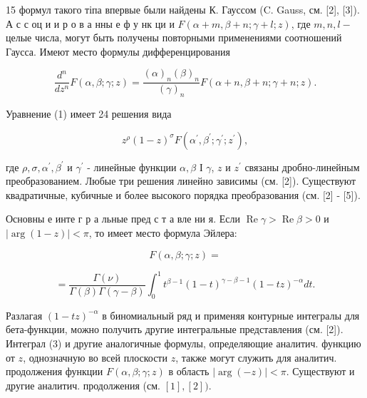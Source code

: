 \documentclass[10pt]{article}
\begin{document}
15 формул такого тіпа впервые были найдены К. Гауссом (C. Gauss, см. [2], [3]). А с с оц и и р о в а нны е ф у нк ци и $F(\alpha+m, \beta+n ; \gamma+l ; z)$, где $m, n, l-$ целые числа, могут быть получены повторными применениями соотношений Гаусса. Имеют место формулы дифференцирования



\[

\frac{d^{n}}{d z^{n}} F(\alpha, \beta ; \gamma ; z)=\frac{(\alpha)_{n}(\beta)_{n}}{(\gamma)_{n}} F(\alpha+n, \beta+n ; \gamma+n ; z) .

\]



Уравнение (1) имеет 24 решения вида



\[

z^{\rho}(1-z)^{\sigma} F\left(\alpha^{\prime}, \beta^{\prime} ; \gamma^{\prime} ; z^{\prime}\right),

\]



где $\rho, \sigma, \alpha^{\prime}, \beta^{\prime}$ и $\gamma^{\prime}$ - линейные функции $\alpha, \beta$ І $\gamma$, $z$ и $z^{\prime}$ связаны дробно-линейным преобразованием. Любые три решения линейно зависимы (см. [2]). Существуют квадратичные, кубичные и более высокого порядка преобразования (см. [2] - [5]).



Основны е инте г р а льные пред с т а вле ни я. Если $\operatorname{Re} \gamma>\operatorname{Re} \beta>0$ и $|\arg (1-z)|<\pi$, то имеет место формула Эйлера:



\[

F(\alpha, \beta ; \gamma ; z)=

\]



\[

=\frac{\Gamma(\nu)}{\Gamma(\beta) \Gamma(\gamma-\beta)} \int_{0}^{1} t^{\beta-1}(1-t)^{\gamma-\beta-1}(1-t z)^{-\alpha} d t .

\]



Разлагая $(1-t z)^{-\alpha}$ в биномиальный ряд и применяя контурные интегралы для бета-функции, можно получить другие интегральные представления (см. [2]). Интеграл (3) и другие аналогичные формулы, определяющие аналитич. функцию от $z$, однозначную во всей плоскости $z$, также могут служить для аналитич. продолжения функции $F(\alpha, \beta ; \gamma ; z)$ в область $|\arg (-z)|<\pi$. Существуют и другие аналитич. продолжения (см. $[1],[2])$.
\end{document}
